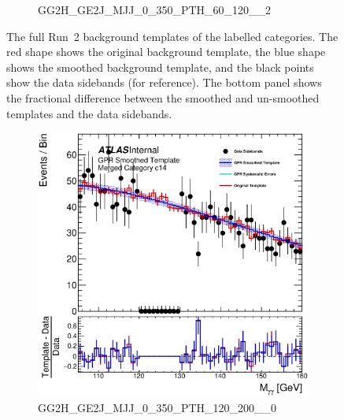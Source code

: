 \begin{figure}
\begin{center}
\begin{subfigure}[T]{0.49\linewidth}
	\caption{GG2H\_GE2J\_MJJ\_0\_350\_PTH\_60\_120\_\_2}
\end{subfigure}
\caption{The full Run~2 background templates of the labelled categories. The red shape shows the original background template, the blue shape shows the smoothed background template, and the black points show the data sidebands (for reference). The bottom panel shows the fractional difference between the smoothed and un-smoothed templates and the data sidebands. }
\label{fig:gpr_coupcat_3}
\end{center}
\end{figure}

\begin{figure}
\begin{center}
\begin{subfigure}[T]{0.49\linewidth}
	\centering
	\includegraphics[width=\linewidth]{figures/background/gpr/coupCatTemplates/GPR_Smoothed_Plot_hmgg_c14.eps}
	\caption{\tiny{GG2H\_GE2J\_MJJ\_0\_350\_PTH\_120\_200\_\_0}}
\end{subfigure}
\begin{subfigure}[T]{0.49\linewidth}
	\centering

\end{subfigure}
\end{center}
\end{figure}
